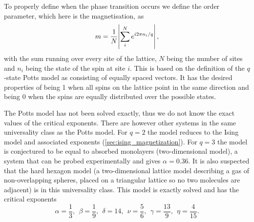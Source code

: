 \documentclass[11pt, a4paper]{report} %
\begin{document}
To properly define when the phase transition occurs we define the order parameter, which here is the magnetisation, as
\begin{equation}
	m = \frac{1}{N}\abs{\sum_i^N e^{i2\pi n_i / q}},
\end{equation}
with the sum running over every site of the lattice, \(N\) being the number of sites and \(n_i\) being the state of the spin at site \(i\).
This is based on the definition of the \(q\)-state Potts model as consisting of equally spaced vectors.
It has the desired properties of being 1 when all spins on the lattice point in the same direction and being 0 when the spins are equally distributed over the possible states.

The Potts model has not been solved exactly, thus we do not know the exact values of the critical exponents.
There are however other systems in the same universality class as the Potts model.
For \(q=2\) the model reduces to the Ising model and associated exponents (\cref{sec:ising_magnetization}).
For \(q=3\) the model is conjectured to be equal to absorbed monolayers (two-dimensional model), a system that can be probed experimentally and gives \(\alpha = 0.36\)\cite{binder:1981a}.
It is also suspected that the hard hexagon model (a two-dimensional lattice model describing a gas of non-overlapping spheres, placed on a triangular lattice so no two molecules are adjacent) is in this universality class.
This model is exactly solved and has the critical exponents\cite{baxter:1989,wu:1982}
\begin{equation}\label{eq:potts_critical_exponents}
	\alpha = \frac{1}{3},\ \ \beta = \frac{1}{9},\ \ \delta = 14,\ \ \nu = \frac{5}{6},\ \ \gamma = \frac{13}{9},\ \ \eta = \frac{4}{15}.
\end{equation}
\end{document}
